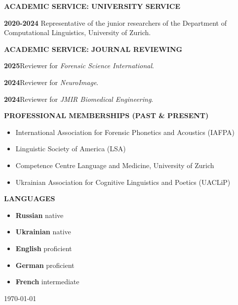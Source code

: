 \documentclass[11pt]{article}
\newcommand{\hangpara}{
 \setlength{\parindent}{0in} %
 \hangindent=0.42in %
}
\begin{document}
\vskip 20pt
\begin{flushleft}
{\bf ACADEMIC SERVICE: UNIVERSITY SERVICE}
\end{flushleft}
\hangpara
{\bf 2020-2024}\hspace{1ex} Representative of the junior researchers of the Department of Computational Linguistics, University of Zurich.




\vskip 20pt
\begin{flushleft}
{\bf ACADEMIC SERVICE: JOURNAL REVIEWING}
\end{flushleft}
\hangpara
{\bf 2025}\hspace{1ex}Reviewer for \textit{Forensic Science International}.
\vskip 6pt
\hangpara
{\bf 2024}\hspace{1ex}Reviewer for \textit{NeuroImage}.
\vskip 6pt
\hangpara
{\bf 2024}\hspace{1ex}Reviewer for \textit{JMIR Biomedical Engineering}.



\vskip 20pt
\begin{flushleft}
{\bf PROFESSIONAL MEMBERSHIPS (PAST \& PRESENT)}
\end{flushleft}
\begin{itemize}
\item International Association for Forensic Phonetics and Acoustics (IAFPA)
\item Linguistic Society of America (LSA)
\item Competence Centre Language and Medicine, University of Zurich
\item Ukrainian Association for Cognitive Linguistics and Poetics (UACLiP)
\end{itemize}



\vskip 10pt
\begin{flushleft}
{\bf LANGUAGES}
\end{flushleft}
\begin{itemize}
\item {\bf Russian} native
\item {\bf Ukrainian} native
\item {\bf English} proficient
\item {\bf German} proficient
\item {\bf French} intermediate
\end{itemize}

\vskip 20pt
\today
\end{document}
